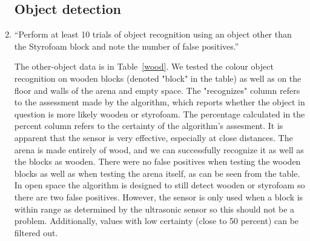 \documentclass[twocolumn]{article}
\begin{document}
\begin{enumerate}

\subsection{Object detection}

\item
``Perform at least 10 trials of object recognition using an object other than the Styrofoam block and note the number of false positives.\cite{lab5}''

The other-object data is in Table~\ref{wood}. We tested the colour object recognition on wooden blocks (denoted "block" in the table) as well as on the floor and walls of the arena and empty space. The "recognizes" column refers to the assessment made by the algorithm, which reports whether the object in question is more likely wooden or styrofoam. The percentage calculated in the percent column refers to the certainty of the algorithm's assesment. It is apparent that the sensor is very effective, especially at close distances. The arena is made entirely of wood, and we can successfully recognize it as well as the blocks as wooden. There were no false positives when testing the wooden blocks as well as when testing the arena itself, as can be seen from the table. In open space the algorithm is designed to still detect wooden or styrofoam so there are two false positives. However, the sensor is only used when a block is within range as determined by the ultrasonic sensor so this should not be a problem. Additionally, values with low certainty (close to 50 percent) can be filtered out.


\end{enumerate}
\end{document}
